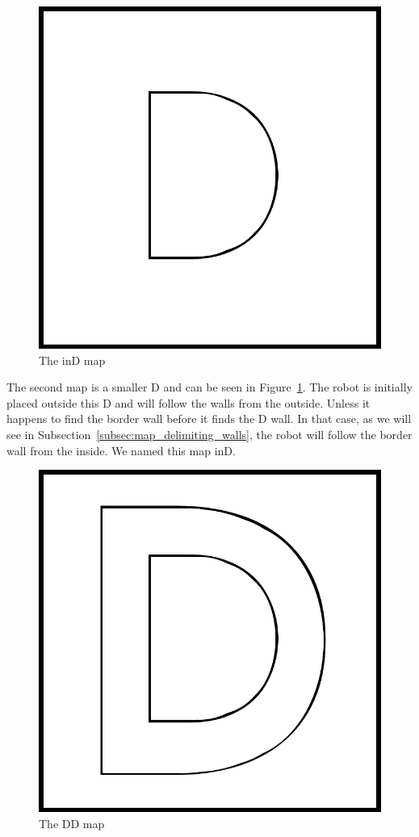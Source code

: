 \documentclass[10pt,journal,compsoc]{IEEEtran}
\begin{document}
\begin{figure}[thpb]
\centering
\includegraphics[scale=0.2]{img/inD.png}
\caption{The inD map}
\label{fig:inD_map}
\end{figure}

The second map is a smaller D and can be seen in Figure~\ref{fig:inD_map}. The robot is initially placed outside this D and will follow the walls from the outside. Unless it happens to find the border wall before it finds the D wall. In that case, as we will see in Subsection~\ref{subsec:map_delimiting_walls}, the robot will follow the border wall from the inside. We named this map inD.

\begin{figure}[thpb]
\centering
\includegraphics[scale=0.2]{img/DD.png}
\caption{The DD map}
\label{fig:DD_map}
\end{figure}
\end{document}
